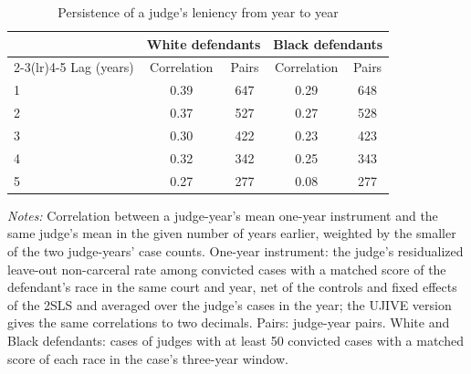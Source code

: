 \documentclass[11pt]{article}
\newcommand{\tabnote}[1]{\par\vspace{0.6ex}\begin{minipage}{\linewidth}\linespread{1}\footnotesize\textit{Notes:} #1\end{minipage}}
\newcommand{\racesamplenote}{White and Black defendants: cases of judges with at least 50 convicted cases with a matched score of each race in the case's three-year window.}
\begin{document}
\begin{table}[H]
\centering
\caption{Persistence of a judge's leniency from year to year}\label{tab:persist}
{\small\renewcommand{\arraystretch}{0.9}
\begin{tabular}{lcccc}
\toprule
 & \multicolumn{2}{c}{White defendants} & \multicolumn{2}{c}{Black defendants} \\
\cmidrule(lr){2-3}\cmidrule(lr){4-5}
Lag (years) & Correlation & Pairs & Correlation & Pairs \\
\midrule
1 & 0.39 & 647 & 0.29 & 648 \\
2 & 0.37 & 527 & 0.27 & 528 \\
3 & 0.30 & 422 & 0.23 & 423 \\
4 & 0.32 & 342 & 0.25 & 343 \\
5 & 0.27 & 277 & 0.08 & 277 \\
\bottomrule
\end{tabular}}
\tabnote{Correlation between a judge-year's mean one-year instrument and the same judge's mean in the given number of years earlier, weighted by the smaller of the two judge-years' case counts. One-year instrument: the judge's residualized leave-out non-carceral rate among convicted cases with a matched score of the defendant's race in the same court and year, net of the controls and fixed effects of the 2SLS and averaged over the judge's cases in the year; the UJIVE version gives the same correlations to two decimals. Pairs: judge-year pairs. \racesamplenote}
\end{table}
\end{document}
